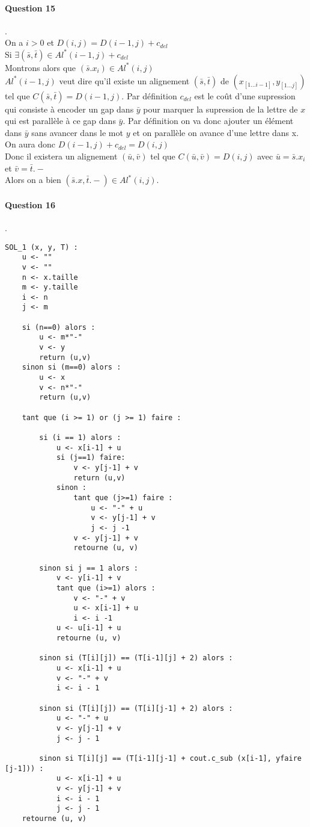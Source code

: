 \paragraph{Question 15}.\\
On a $i > 0$ et $D(i,j) = D(i-1,j)+c_{del}$\\
Si $\exists(\bar s, \bar t) \in Al^*(i-1,j)+c_{del}$\\
Montrons alors que $(\bar s.x_i)\in Al^*(i,j)$\\
$Al^*(i-1,j)$ veut dire qu'il existe un alignement $(\bar s, \bar t)$ de $(x_[1...i-1], y_[1...j])$ tel que $C(\bar s, \bar t) = D(i-1, j)$. Par définition $c_{del}$ est le coût d'une supression qui consiste à encoder un gap dans $\bar y$ pour marquer la supression de la lettre de $x$ qui est parallèle à ce gap dans $\bar y$.
Par définition on va donc ajouter un élément dans $\bar y$ sans avancer dans le mot $y$ et on parallèle on avance d'une lettre dans x.\\
On aura donc $D(i-1,j)+c_{del} = D(i,j)$\\
Donc il existera un alignement $(\bar u, \bar v)$ tel que $C(\bar u, \bar v) = D(i,j)$ avec $\bar u = \bar s.x_i$ et $\bar v = \bar t.-$\\
Alors on a bien $(\bar s.x, \bar t.-) \in Al^*(i,j)$.
\paragraph{Question 16}.\\
\begin{lstlisting}
SOL_1 (x, y, T) :
    u <- ""
    v <- ""
    n <- x.taille
    m <- y.taille
    i <- n
    j <- m

    si (n==0) alors :
        u <- m*"-"
        v <- y
        return (u,v)
    sinon si (m==0) alors :
        u <- x
        v <- n*"-"
        return (u,v)

    tant que (i >= 1) or (j >= 1) faire :

        si (i == 1) alors :
            u <- x[i-1] + u
            si (j==1) faire:
                v <- y[j-1] + v
                return (u,v)
            sinon :
                tant que (j>=1) faire :
                    u <- "-" + u
                    v <- y[j-1] + v
                    j <- j -1
                v <- y[j-1] + v
                retourne (u, v)

        sinon si j == 1 alors :
            v <- y[i-1] + v
            tant que (i>=1) alors :
                v <- "-" + v
                u <- x[i-1] + u
                i <- i -1
            u <- u[i-1] + u
            retourne (u, v)

        sinon si (T[i][j]) == (T[i-1][j] + 2) alors :
            u <- x[i-1] + u
            v <- "-" + v
            i <- i - 1

        sinon si (T[i][j]) == (T[i][j-1] + 2) alors :
            u <- "-" + u
            v <- y[j-1] + v
            j <- j - 1

        sinon si T[i][j] == (T[i-1][j-1] + cout.c_sub (x[i-1], yfaire [j-1])) :
            u <- x[i-1] + u
            v <- y[j-1] + v
            i <- i - 1
            j <- j - 1
    retourne (u, v)
\end{lstlisting}
